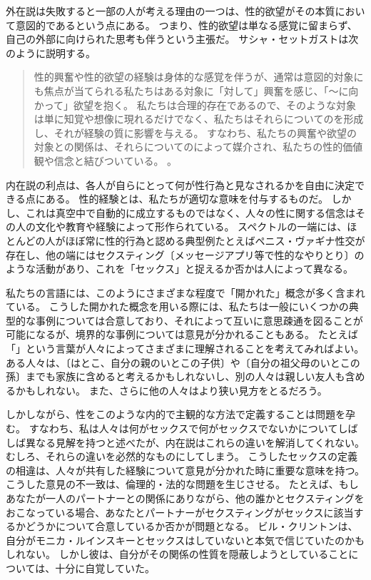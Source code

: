 \documentclass[paper=a4,book,openany]{jlreq} \usepackage{mystyle}
\begin{document}
外在説は失敗すると一部の人が考える理由の一つは、性的欲望がその本質において意図的であるという点にある。
つまり、性的欲望は単なる感覚に留まらず、自己の外部に向けられた思考も伴うという主張だ。
サシャ・セットガストは次のように説明する。
\begin{quote}
  性的興奮や性的欲望の経験は身体的な感覚を伴うが、通常は意図的対象にも焦点が当てられる{\DDASH}私たちはある対象に「対して」興奮を感じ、「～に向かって」欲望を抱く。
私たちは合理的存在であるので、そのような対象は単に知覚や想像に現れるだけでなく、私たちはそれらについてのを形成し、それが経験の質に影響を与える。
すなわち、私たちの興奮や欲望の対象との関係は、それらについてのによって媒介され、私たちの性的価値観や信念と結びついている。  \citep[p. 384, 強調は原文]{settegast18:_prost_good_sex}。
\end{quote}

内在説の利点は、各人が自らにとって何が性行為と見なされるかを自由に決定できる点にある。
性的経験とは、私たちが適切な意味を付与するものだ。
しかし、これは真空中で自動的に成立するものではなく、人々の性に関する信念はその人の文化や教育や経験によって形作られている。
スペクトルの一端には、ほとんどの人がほぼ常に性的行為と認める典型例{\DDASH}たとえばペニス・ヴァギナ性交{\DDASH}が存在し、他の端にはセクスティング〔メッセージアプリ等で性的なやりとり〕のような活動があり、これを「セックス」と捉えるか否かは人によって異なる。

私たちの言語には、このようにさまざまな程度で「開かれた」概念が多く含まれている。
こうした開かれた概念を用いる際には、私たちは一般にいくつかの典型的な事例については合意しており、それによって互いに意思疎通を図ることが可能になるが、境界的な事例については意見が分かれることもある。
たとえば「」という言葉が人々によってさまざまに理解されることを考えてみればよい。
ある人々は、〔はとこ、自分の親のいとこの子供〕や〔自分の祖父母のいとこの孫〕までも家族に含めると考えるかもしれないし、別の人々は親しい友人も含めるかもしれない。
また、さらに他の人々はより狭い見方をとるだろう。

しかしながら、性をこのような内的で主観的な方法で定義することは問題を孕む。
すなわち、私は人々は何がセックスで何がセックスでないかについてしばしば異なる見解を持つと述べたが、内在説はこれらの違いを解消してくれない。
むしろ、それらの違いを必然的なものにしてしまう。
こうしたセックスの定義の相違は、人々が共有した経験について意見が分かれた時に重要な意味を持つ。
こうした意見の不一致は、倫理的・法的な問題を生じさせる。
たとえば、もしあなたが一人のパートナーとの関係にありながら、他の誰かとセクスティングをおこなっている場合、あなたとパートナーがセクスティングがセックスに該当するかどうかについて合意しているか否かが問題となる。
ビル・クリントンは、自分がモニカ・ルインスキーとセックスはしていないと本気で信じていたのかもしれない。
しかし彼は、自分がその関係の性質を隠蔽しようとしていることについては、十分に自覚していた。
\end{document}
